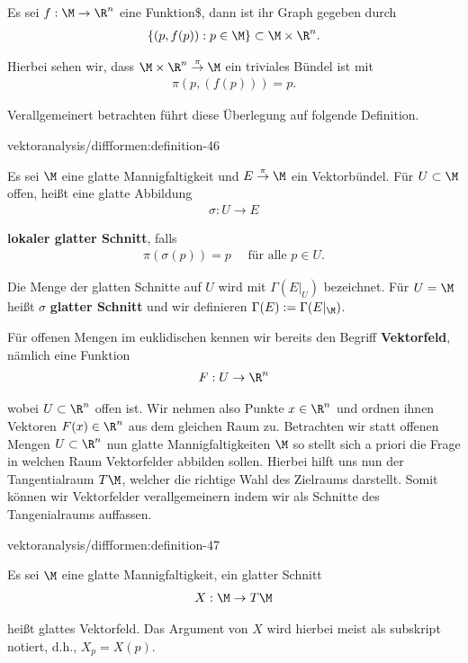 \documentclass[letterpaper,10pt,english]{jupyterBook}
\begin{document}
\par
Es sei \(f:\M\to\R^n\) eine Funktion\$, dann ist ihr Graph gegeben durch
\begin{align*}
\{(p,f(p)): p\in\M\}\subset \M\times\R^n.
\end{align*}
\par
Hierbei sehen wir, dass \(\M\times\R^n\overset{\pi}{\to}\M\) ein triviales Bündel ist mit
\begin{align*}
\pi(p,(f(p))) = p.
\end{align*}
\par
Verallgemeinert betrachten führt diese Überlegung auf folgende Definition.
\begin{definition}{}{vektoranalysis/diffformen:definition-46}



\par
Es sei \(\M\) eine glatte Mannigfaltigkeit und \(E\overset{\pi}{\to}\M\) ein Vektorbündel. Für \(U\subset\M\) offen, heißt eine glatte Abbildung
\begin{align*}
\sigma: U\to E
\end{align*}
\par
\textbf{lokaler glatter Schnitt}, falls
\begin{align*}
\pi(\sigma(p)) = p\quad\text{ für alle }p\in U.
\end{align*}
\par
Die Menge der glatten Schnitte auf \(U\) wird mit \(\Gamma(E\rvert_U)\) bezeichnet. Für \(U=\M\) heißt \(\sigma\) \textbf{glatter Schnitt} und wir definieren
\(\Gamma(E):=\Gamma(E\rvert_\M)\).
\end{definition}

\par
Für offenen Mengen im euklidischen kennen wir bereits den Begriff \textbf{Vektorfeld}, nämlich eine Funktion
\begin{align*}
F:U\to\R^n
\end{align*}
\par
wobei \(U\subset\R^n\) offen ist. Wir nehmen also Punkte \(x\in\R^n\) und ordnen ihnen Vektoren \(F(x)\in\R^n\) aus dem gleichen Raum zu. Betrachten wir statt offenen Mengen \(U\subset\R^n\) nun glatte Mannigfaltigkeiten \(\M\) so stellt sich a priori die Frage in welchen Raum Vektorfelder abbilden sollen. Hierbei hilft uns nun der Tangentialraum \(T\M\), welcher die richtige Wahl des Zielraums darstellt. Somit können wir Vektorfelder verallgemeinern indem wir als Schnitte des Tangenialraums auffassen.
\begin{definition}{}{vektoranalysis/diffformen:definition-47}



\par
Es sei \(\M\) eine glatte Mannigfaltigkeit, ein glatter Schnitt
\begin{align*}
X:\M\to T\M
\end{align*}
\par
heißt glattes Vektorfeld. Das Argument von \(X\) wird hierbei meist als subskript notiert, d.h., \(X_p = X(p)\).
\end{definition}
\end{document}
